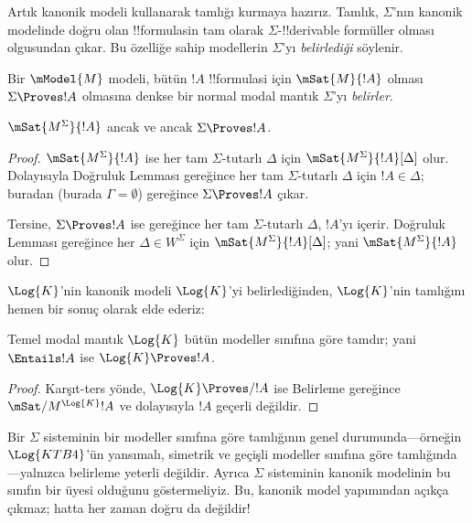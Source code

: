 



Artık kanonik modeli kullanarak tamlığı kurmaya hazırız. Tamlık,
$\Sigma$'nın kanonik modelinde doğru olan !!{formula}s{}in tam olarak
$\Sigma$-!!{derivable} formüller olması olgusundan çıkar. Bu özelliğe sahip
modellerin $\Sigma$'yı \emph{belirlediği} söylenir.

\begin{defn}
  Bir $\mModel{M}$ modeli, bütün $!A$ !!{formula}s{}i için
  $\mSat{M}{!A}$ olması $\Sigma\Proves !A$ olmasına denkse bir normal modal
  mantık $\Sigma$'yı \emph{belirler}.
\end{defn}

\begin{thm}[Belirleme]
   $\mSat{M^\Sigma}{!A}$ ancak ve ancak $\Sigma\Proves !A$.
\end{thm}

\begin{proof}
  $\mSat{M^\Sigma}{!A}$ ise her tam $\Sigma$-tutarlı $\Delta$ için
  $\mSat{M^\Sigma}{!A}[\Delta]$ olur. Dolayısıyla Doğruluk Lemması
  gereğince her tam $\Sigma$-tutarlı $\Delta$ için $!A\in\Delta$;
  buradan  (burada
  $\Gamma=\emptyset$) gereğince $\Sigma\Proves !A$ çıkar.

  Tersine, $\Sigma\Proves !A$ ise
   gereğince
  her tam $\Sigma$-tutarlı $\Delta$, $!A$'yı içerir. Doğruluk Lemması
  gereğince her $\Delta\in W^\Sigma$ için
  $\mSat{M^\Sigma}{!A}[\Delta]$; yani $\mSat{M^\Sigma}{!A}$ olur.
\end{proof}

$\Log{K}$'nin kanonik modeli $\Log{K}$'yi belirlediğinden, $\Log{K}$'nin
tamlığını hemen bir sonuç olarak elde ederiz:

\begin{cor}
  Temel modal mantık $\Log{K}$ bütün modeller sınıfına göre tamdır; yani
  $\Entails !A$ ise $\Log{K}\Proves !A$.
\end{cor}

\begin{proof}
  Karşıt-ters yönde, $\Log{K}\Proves/ !A$ ise Belirleme gereğince
  $\mSat/{M^{\Log{K}}}{!A}$ ve dolayısıyla $!A$ geçerli değildir.
\end{proof}

Bir $\Sigma$ sisteminin bir modeller sınıfına göre tamlığının genel
durumunda---örneğin $\Log{KTB4}$'ün yansımalı, simetrik ve geçişli modeller
sınıfına göre tamlığında---yalnızca belirleme yeterli değildir. Ayrıca
$\Sigma$ sisteminin kanonik modelinin bu sınıfın bir üyesi olduğunu
göstermeliyiz. Bu, kanonik model yapımından açıkça çıkmaz; hatta her zaman
doğru da değildir!

